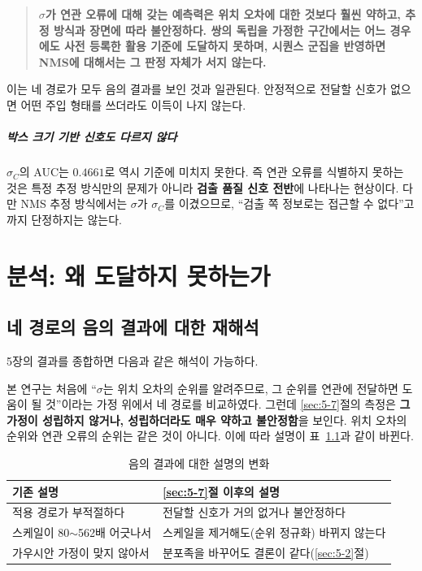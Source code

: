 \documentclass[12pt,a4paper,oneside]{report}
\begin{document}
\begin{quote}
\textbf{$\sigma$가 연관 오류에 대해 갖는 예측력은 위치 오차에 대한 것보다 훨씬 약하고, 추정 방식과 장면에 따라 불안정하다. 쌍의 독립을 가정한 구간에서는 어느 경우에도 사전 등록한 활용 기준에 도달하지 못하며, 시퀀스 군집을 반영하면 NMS에 대해서는 그 판정 자체가 서지 않는다.}
\end{quote}

이는 네 경로가 모두 음의 결과를 보인 것과 일관된다. 안정적으로 전달할 신호가 없으면 어떤 주입 형태를 쓰더라도 이득이 나지 않는다.

\paragraph{박스 크기 기반 신호도 다르지 않다} $\sigma_C$의 AUC는 $0.4661$로 역시 기준에 미치지 못한다. 즉 연관 오류를 식별하지 못하는 것은 특정 추정 방식만의 문제가 아니라 \textbf{검출 품질 신호 전반}에 나타나는 현상이다. 다만 NMS 추정 방식에서는 $\sigma$가 $\sigma_C$를 이겼으므로, ``검출 쪽 정보로는 접근할 수 없다''고까지 단정하지는 않는다.

\chapter{분석: 왜 도달하지 못하는가}

\section{네 경로의 음의 결과에 대한 재해석}\label{sec:6-1}

5장의 결과를 종합하면 다음과 같은 해석이 가능하다.

본 연구는 처음에 ``$\sigma$는 위치 오차의 순위를 알려주므로, 그 순위를 연관에 전달하면 도움이 될 것''이라는 가정 위에서 네 경로를 비교하였다. 그런데 \ref{sec:5-7}절의 측정은 \textbf{그 가정이 성립하지 않거나, 성립하더라도 매우 약하고 불안정함}을 보인다. 위치 오차의 순위와 연관 오류의 순위는 같은 것이 아니다. 이에 따라 설명이 표~\ref{tab:reinterp}과 같이 바뀐다.

\begin{table}[htbp]
\centering
\small
\caption{음의 결과에 대한 설명의 변화}
\label{tab:reinterp}
\begin{tabularx}{\textwidth}{p{}X}
\toprule
\textbf{기존 설명} & \ref{sec:5-7}절 이후의 설명 \\
\midrule
적용 경로가 부적절하다 & 전달할 신호가 거의 없거나 불안정하다 \\
스케일이 80$\sim$562배 어긋나서 & 스케일을 제거해도(순위 정규화) 바뀌지 않는다 \\
가우시안 가정이 맞지 않아서 & 분포족을 바꾸어도 결론이 같다(\ref{sec:5-2}절) \\
\bottomrule
\end{tabularx}
\end{table}
\end{document}
